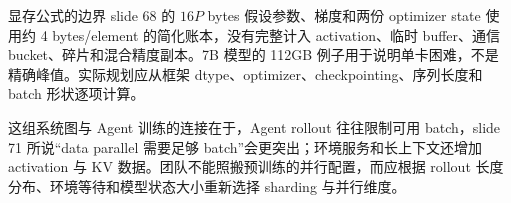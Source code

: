 \begin{warningbox}{显存公式的边界}
slide 68 的 $16P$ bytes 假设参数、梯度和两份 optimizer state 使用约 4 bytes/element 的简化账本，没有完整计入 activation、临时 buffer、通信 bucket、碎片和混合精度副本。7B 模型的 112GB 例子用于说明单卡困难，不是精确峰值。实际规划应从框架 dtype、optimizer、checkpointing、序列长度和 batch 形状逐项计算。
\end{warningbox}

这组系统图与 Agent 训练的连接在于，Agent rollout 往往限制可用 batch，slide 71 所说“data parallel 需要足够 batch”会更突出；环境服务和长上下文还增加 activation 与 KV 数据。团队不能照搬预训练的并行配置，而应根据 rollout 长度分布、环境等待和模型状态大小重新选择 sharding 与并行维度。

